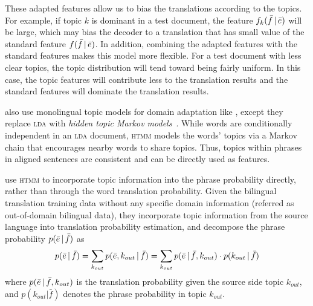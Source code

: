 These adapted features allow us to bias the translations according to
the topics. For example, if topic $k$ is dominant in a test document,
the feature $f_k(\bar{f} \, | \, \bar{e})$ will be large, which may bias the
decoder to a translation that has small value of the standard feature
$f(\bar{f} \, | \, \bar{e})$. In addition, combining the adapted features with
the standard features makes this model more flexible. For a test
document with less clear topics, the topic distribution will tend
toward being fairly uniform. In this case, the topic features will
contribute less to the translation results and the standard features
will dominate the translation results.

\citet{hasler-12} also use monolingual topic models for domain
adaptation like \citet{Eidelman-12}, except they replace \textsc{lda}
with \emph{hidden topic Markov
  models}~\citep[\textsc{htmm}]{gruber-07}.  While words are
conditionally independent in an \textsc{lda} document, \textsc{htmm}
models the words' topics via a Markov chain that encourages nearby
words to share topics.  Thus, topics within phrases in aligned
sentences are consistent and can be directly used as features.


\citet{su-12} use \textsc{htmm} to incorporate topic information
into the phrase probability directly, rather than through the word
translation probability.
Given the bilingual translation
training data without any specific domain information (referred as
out-of-domain bilingual data), they incorporate topic information
from the source language into translation probability estimation, and
decompose the phrase probability $p(\bar{e} \, | \, \bar{f})$ as
\begin{align}
p(\bar{e} \, | \, \bar{f}) = \sum_{k_{out}} p(\bar{e}, k_{out} \, | \, \bar{f})
  = \sum_{k_{out}} p(\bar{e} \, | \, \bar{f}, k_{out})  \cdot p(k_{out} \, | \, \bar{f})
\end{align}
where $p(\bar{e} \, | \, \bar{f}, k_{out})$ is the translation probability given 
the source side topic $k_{out}$, and $p(k_{out} | \bar{f})$ denotes the 
phrase probability in topic $k_{out}$.

